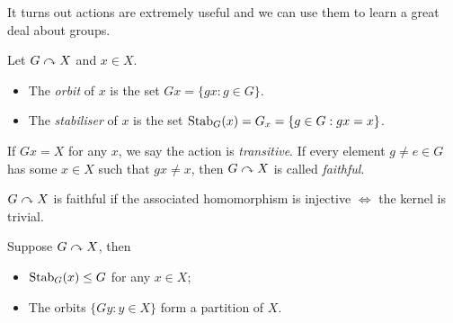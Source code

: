 \documentclass{../../template/note}
\begin{document}
    It turns out actions are extremely useful and we can use them to learn a great deal about groups.

    \begin{definition}
        Let \(G \curvearrowright X\) and \(x \in X\).
        \begin{itemize}
            \item The \emph{orbit} of \(x\) is the set \(Gx = \{gx: g \in G\}\).
            \item The \emph{stabiliser} of \(x\) is the set \(\operatorname{Stab}_G(x) = G_x = \{g \in G: gx = x\}\).
        \end{itemize}
        If \(Gx = X\) for any \(x\), we say the action is \emph{transitive}. If every element \(g \neq e \in G\) has some \(x \in X\) such that \(gx \neq x\), then \(G \curvearrowright X\) is called \emph{faithful}.
    \end{definition}
    
    \begin{remark*}
        \(G \curvearrowright X\) is faithful if the associated homomorphism is injective \(\iff\) the kernel is trivial.
    \end{remark*}

    
    \begin{proposition}
        Suppose \(G \curvearrowright X\), then
        \begin{itemize}
            \item \(\operatorname{Stab}_G(x) \leq G\) for any \(x \in X\);
            \item The orbits \(\{Gy: y \in X\}\) form a partition of \(X\).
        \end{itemize}
        \label{stab-subgroup-orbits-partition}
    \end{proposition}
    
\end{document}
